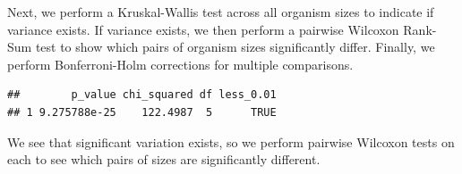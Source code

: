 \documentclass[
]{book}
\newenvironment{Shaded}{\begin{snugshade}}{\end{snugshade}}
\newcommand{\DataTypeTok}[1]{\textcolor[rgb]{0.13,0.29,0.53}{#1}}
\newcommand{\DecValTok}[1]{\textcolor[rgb]{0.00,0.00,0.81}{#1}}
\newcommand{\FloatTok}[1]{\textcolor[rgb]{0.00,0.00,0.81}{#1}}
\newcommand{\KeywordTok}[1]{\textcolor[rgb]{0.13,0.29,0.53}{\textbf{#1}}}
\newcommand{\NormalTok}[1]{#1}
\newcommand{\OperatorTok}[1]{\textcolor[rgb]{0.81,0.36,0.00}{\textbf{#1}}}
\newcommand{\StringTok}[1]{\textcolor[rgb]{0.31,0.60,0.02}{#1}}
\begin{document}
Next, we perform a Kruskal-Wallis test across all organism sizes to indicate if variance exists.
If variance exists, we then perform a pairwise Wilcoxon Rank-Sum test to show which pairs of organism sizes significantly differ.
Finally, we perform Bonferroni-Holm corrections for multiple comparisons.

\begin{Shaded}
\end{Shaded}

\begin{verbatim}
##        p_value chi_squared df less_0.01
## 1 9.275788e-25    122.4987  5      TRUE
\end{verbatim}

We see that significant variation exists, so we perform pairwise Wilcoxon tests on each to see which pairs of sizes are significantly different.
\end{document}
